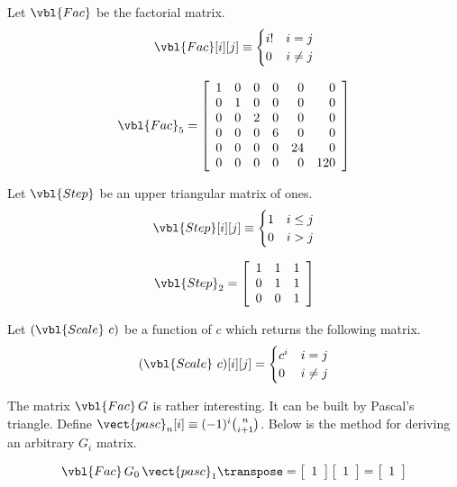 Let $\vbl{Fac}$ be the factorial matrix.
\begin{equation}
 \label{eq:def_Fac}
 \vbl{Fac}[i][j] \equiv
 \begin{cases}
  i! & i = j \\
  0 & i \ne j
 \end{cases}
\end{equation}

\[
 \vbl{Fac}_5 =
\left[
\begin{array}{rrrrrr}
 1 & 0 & 0 & 0 &  0 &   0 \\
 0 & 1 & 0 & 0 &  0 &   0 \\
 0 & 0 & 2 & 0 &  0 &   0 \\
 0 & 0 & 0 & 6 &  0 &   0 \\
 0 & 0 & 0 & 0 & 24 &   0 \\
 0 & 0 & 0 & 0 &  0 & 120 \\
\end{array}
\right]
\]

Let $\vbl{Step}$ be an upper triangular matrix of ones.
\begin{equation}
 \label{eq:def_Step}
 \vbl{Step}[i][j] \equiv
 \begin{cases}
  1 & i \le j \\
  0 & i > j
 \end{cases}
\end{equation}

\[
 \vbl{Step}_2 =
\left[
\begin{array}{rrr}
 1 & 1 & 1 \\
 0 & 1 & 1 \\
 0 & 0 & 1 \\
\end{array}
\right]
\]

Let $(\vbl{Scale}\ c)$ be a function of $c$ which returns the following matrix.
\begin{equation}
 \label{eq:def_Scale}
 (\vbl{Scale}\ c)[i][j] =
 \begin{cases}
  c^i & i = j \\
  0 & i \ne j
 \end{cases}
\end{equation}


The matrix $\vbl{Fac}\,G$ is rather interesting.
It can be built by Pascal's triangle.
Define $\vect{pasc}_n [i]\equiv (-1)^i {n \choose i+1}$.
Below is the method for deriving an arbitrary $G_i$ matrix.

\[
 \vbl{Fac}\,G_0\,\vect{pasc}_1\transpose =
 \left[\begin{array}{r}
   1 \\
 \end{array}\right]
 \left[\begin{array}{r}
   1 \\
 \end{array}\right]
 =
 \left[\begin{array}{r}
   1 \\
 \end{array}\right]
\]

